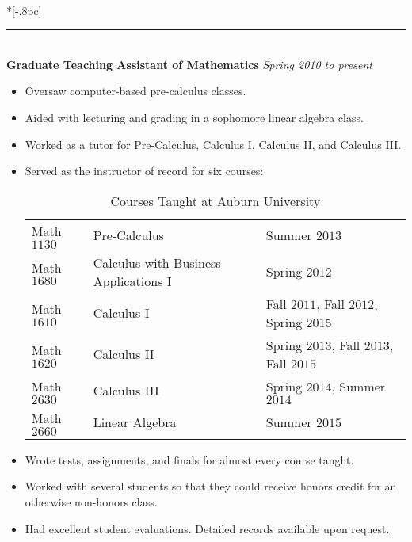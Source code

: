 \documentclass{article}
\begin{document}
 \\*[-.8pc]
\rule{\textwidth}{.1pt} \\
{\bf Graduate Teaching Assistant of Mathematics} \hfill {\it Spring 2010 to present\/}
\begin{itemize}[noitemsep]
\item Oversaw computer-based pre-calculus classes.
\item Aided with lecturing and grading in a sophomore
  linear algebra class.  
\item Worked as a tutor for Pre-Calculus, Calculus I, Calculus II, and
  Calculus III.  
\item Served as the instructor of record for six courses:
\begin{table}[H]
\begin{center}
\begin{tabular}{lll}
Math $1130$ & Pre-Calculus & Summer $2013$ \\
Math $1680$ & Calculus with Business Applications I & Spring $2012$ \\
Math $1610$ & Calculus I & Fall $2011$, Fall $2012$, Spring $2015$ \\
Math $1620$ & Calculus II & Spring $2013$, Fall $2013$, Fall $2015$ \\
Math $2630$ & Calculus III & Spring $2014$, Summer $2014$ \\
Math $2660$ & Linear Algebra & Summer $2015$ \\
[-1pc]
\end{tabular}
\end{center}
\caption{Courses Taught at Auburn University}%
\end{table}
\item Wrote tests, assignments, and finals for almost every course taught.
\item Worked with several students so that they could receive honors credit for
  an otherwise non-honors class.
\item Had excellent student evaluations. Detailed records available upon
  request.
\end{itemize}
\end{document}
